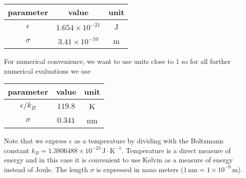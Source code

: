 \documentclass[paper=letter]{scrartcl}
\begin{document}
\begin{center}
  \begin{tabular}{ccc}
    \toprule
    parameter & value & unit\\
    \midrule
    $\epsilon$ & $1.654 \times 10^{-21}$ & J\\
    $\sigma$ & $3.41\times 10^{-10}$& m\\
    \bottomrule                        
  \end{tabular}
\end{center}
For numerical convenience, we want to use units close to 1 so for all
further numerical evaluations we use
\begin{center}
  \begin{tabular}{ccc}
    \toprule
    parameter & value & unit\\
    \midrule
    $\epsilon/k_{B}$ & $119.8$ & K\\
    $\sigma$ & $0.341$& nm\\
    \bottomrule                        
  \end{tabular}
\end{center}
Note that we express $\epsilon$ as a temperature by dividing with the
Boltzmann constant
$k_{B} = 1.3806488 \times
10^{-23}\,\text{J}\cdot\text{K}^{-1}$. Temperature is a direct measure
of energy and in this case it is convenient to use Kelvin as a measure
of energy instead of Joule. The length $\sigma$ is expressed in nano
meters ($1\,\text{nm} = 1\times 10^{-9}\,\text{m}$).
\end{document}
